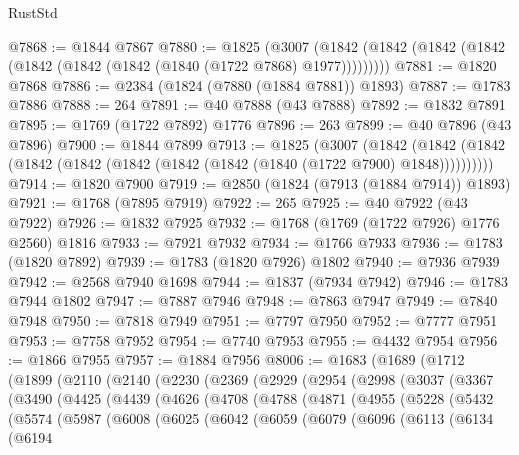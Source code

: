 \begin{lexlean}{RustStd}
\begin{coremodule}
@7868 := @1844 @7867
@7880 := @1825
    (@3007 (@1842 (@1842 (@1842 (@1842 (@1842 (@1842 (@1842 (@1840 (@1722 @7868) @1977)))))))))
@7881 := @1820 @7868
@7886 := @2384 (@1824 (@7880 (@1884 @7881)) @1893)
@7887 := @1783 @7886
@7888 := 264
@7891 := @40 @7888 (@43 @7888)
@7892 := @1832 @7891
@7895 := @1769 (@1722 @7892) @1776
@7896 := 263
@7899 := @40 @7896 (@43 @7896)
@7900 := @1844 @7899
@7913 := @1825
    (@3007
      (@1842 (@1842 (@1842 (@1842 (@1842 (@1842 (@1842 (@1842 (@1840 (@1722 @7900) @1848))))))))))
@7914 := @1820 @7900
@7919 := @2850 (@1824 (@7913 (@1884 @7914)) @1893)
@7921 := @1768 (@7895 @7919)
@7922 := 265
@7925 := @40 @7922 (@43 @7922)
@7926 := @1832 @7925
@7932 := @1768 (@1769 (@1722 @7926) @1776 @2560) @1816
@7933 := @7921 @7932
@7934 := @1766 @7933
@7936 := @1783 (@1820 @7892)
@7939 := @1783 (@1820 @7926) @1802
@7940 := @7936 @7939
@7942 := @2568 @7940 @1698
@7944 := @1837 (@7934 @7942)
@7946 := @1783 @7944 @1802
@7947 := @7887 @7946
@7948 := @7863 @7947
@7949 := @7840 @7948
@7950 := @7818 @7949
@7951 := @7797 @7950
@7952 := @7777 @7951
@7953 := @7758 @7952
@7954 := @7740 @7953
@7955 := @4432 @7954
@7956 := @1866 @7955
@7957 := @1884 @7956
@8006 := @1683
    (@1689
      (@1712
        (@1899
          (@2110
            (@2140
              (@2230
                (@2369
                  (@2929
                    (@2954
                      (@2998
                        (@3037
                          (@3367
                            (@3490
                              (@4425
                                (@4439
                                  (@4626
                                    (@4708
                                      (@4788
                                        (@4871
                                          (@4955
                                            (@5228
                                              (@5432
                                                (@5574
                                                  (@5987
                                                    (@6008
                                                      (@6025
                                                        (@6042
                                                          (@6059
                                                            (@6079
                                                              (@6096
                                                                (@6113
                                                                  (@6134
                                                                    (@6194

\end{coremodule}
\end{lexlean}
